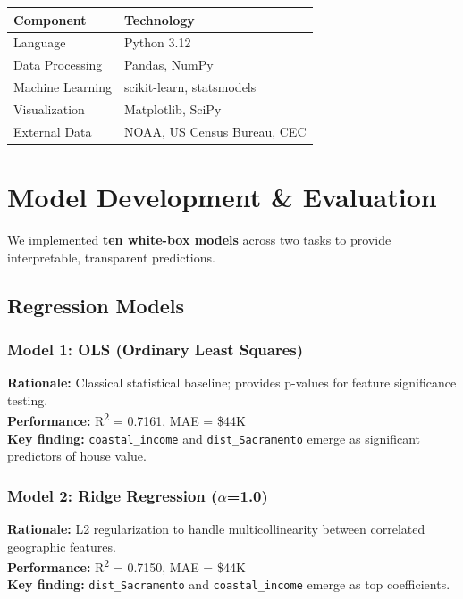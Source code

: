 \documentclass[12pt,a4paper]{article}
\begin{document}
\begin{table}[H]
\centering
\begin{tabular}{ll}
\toprule
\textbf{Component} & \textbf{Technology} \\
\midrule
Language & Python 3.12 \\
Data Processing & Pandas, NumPy \\
Machine Learning & scikit-learn, statsmodels \\
Visualization & Matplotlib, SciPy \\
External Data & NOAA, US Census Bureau, CEC \\
\bottomrule
\end{tabular}
\end{table}

\newpage

\section{Model Development \& Evaluation}

We implemented \textbf{ten white-box models} across two tasks to provide interpretable, transparent predictions.

\subsection{Regression Models}

\subsubsection*{Model 1: OLS (Ordinary Least Squares)}
\textbf{Rationale:} Classical statistical baseline; provides p-values for feature significance testing.\\
\textbf{Performance:} R\textsuperscript{2} = 0.7161, MAE = \$44K\\
\textbf{Key finding:} \texttt{coastal\_income} and \texttt{dist\_Sacramento} emerge as significant predictors of house value.

\subsubsection*{Model 2: Ridge Regression ($\alpha$=1.0)}
\textbf{Rationale:} L2 regularization to handle multicollinearity between correlated geographic features.\\
\textbf{Performance:} R\textsuperscript{2} = 0.7150, MAE = \$44K\\
\textbf{Key finding:} \texttt{dist\_Sacramento} and \texttt{coastal\_income} emerge as top coefficients.
\end{document}
